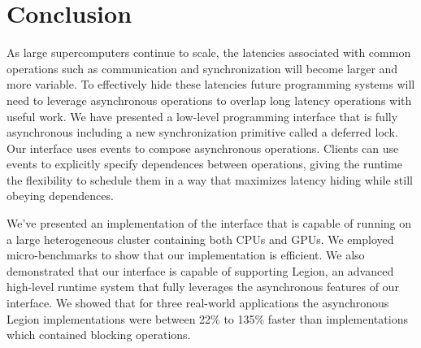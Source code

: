 
\section{Conclusion}
\label{sec:conclusion}

As large supercomputers continue to scale, the latencies associated
with common operations such as communication and synchronization will
become larger and more variable.  To effectively hide these latencies
future programming systems will need to leverage asynchronous operations
to overlap long latency operations with useful work.  We have
presented a low-level programming interface that is fully asynchronous
including a new synchronization primitive called a deferred lock.
Our interface uses events to compose asynchronous operations.  Clients
can use events to explicitly specify dependences between operations,
giving the runtime the flexibility to schedule them in a way that maximizes latency 
hiding while still obeying dependences.

We've presented an implementation of the interface that is capable of running
on a large heterogeneous cluster containing both CPUs and GPUs.  We
employed micro-benchmarks to show that our implementation is efficient.
We also demonstrated that our interface is capable of supporting Legion,
an advanced high-level runtime system that fully leverages the asynchronous
features of our interface.  We showed that for three real-world applications
the asynchronous Legion implementations were between 22\% to 135\% faster than
implementations which contained blocking operations.


